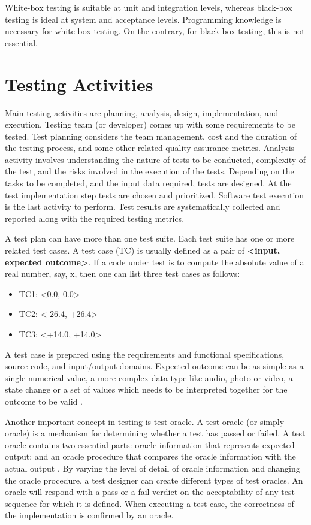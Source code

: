 White-box testing is suitable at unit and integration levels, whereas black-box testing is ideal at system and acceptance levels. Programming knowledge is necessary for white-box testing. On the contrary, for black-box testing, this is not essential.

\section{Testing Activities}
Main testing activities are planning, analysis, design, implementation, and  execution.  Testing team (or developer) comes up with some requirements to be tested. Test planning considers the team management, cost and the duration of the testing process, and some other related quality assurance metrics. Analysis activity involves understanding the nature of tests to be conducted, complexity of the test, and the risks involved in the execution of the tests. Depending on the tasks to be completed, and the input data required, tests are designed. At the test implementation step tests are chosen and prioritized. Software test execution is the last activity to perform. Test results are systematically collected and reported along with the required testing metrics.

A test plan can have more than one test suite. Each test suite has one or more related test cases. A test case (TC) is usually defined as a pair of \textbf{<input, expected outcome>}. If a code under test is to compute the absolute value of a real number, say, x, then one can list three test cases as follows:
\begin{itemize}
    \item TC1: <0.0, 0.0>
    \item TC2: <-26.4, +26.4>
    \item TC3: <+14.0, +14.0>
\end{itemize}
A test case is prepared using the requirements and functional specifications, source code, and input/output domains. Expected outcome can be as simple as a single numerical value, a more complex data type like audio, photo or video, a state change or a set of values which needs to be interpreted together for the outcome to be valid \autocite{naik2011software}.

Another important concept in testing is test oracle. A test oracle (or simply oracle) is a mechanism for determining whether a test has passed or failed. A test oracle contains two essential parts: oracle information that represents expected output; and an oracle procedure that compares the oracle information with the actual output \autocite{memon2003test}. By varying the level of detail of oracle information and changing the oracle procedure, a test designer can create different types of test oracles.  An oracle will respond with a pass or a fail verdict on the acceptability of any test sequence for which it is defined. When executing a test case, the correctness of the implementation is confirmed by an oracle.

